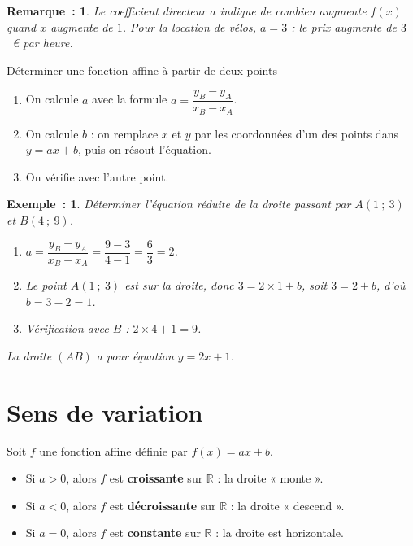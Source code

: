 \documentclass[12pt]{article}
\theoremstyle{break}
\newtheorem*{example}{Exemple~:}
\newtheorem*{remark}{Remarque~:}
\theoremstyle{inline}
\begin{document}
\begin{remark}
  Le coefficient directeur $a$ indique de combien augmente $f(x)$ quand $x$ augmente de $1$.
  Pour la location de vélos, $a = 3$ : le prix augmente de $3$~€ par heure.
\end{remark}

\begin{method}{Déterminer une fonction affine à partir de deux points}{}
  \begin{enumerate}
    \item On calcule $a$ avec la formule $a = \dfrac{y_B - y_A}{x_B - x_A}$.
    \item On calcule $b$ : on remplace $x$ et $y$ par les coordonnées d'un des points dans $y = ax + b$, puis on résout l'équation.
    \item On vérifie avec l'autre point.
  \end{enumerate}
\end{method}

\begin{example}
  Déterminer l'équation réduite de la droite passant par $A(1~;~3)$ et $B(4~;~9)$.

  \begin{multihideW}[1.5em]
    \begin{enumerate}
      \item $a = \dfrac{y_B - y_A}{x_B - x_A} = \dfrac{9 - 3}{4 - 1} = \dfrac{6}{3} = 2$.
      \item Le point $A(1~;~3)$ est sur la droite, donc $3 = 2 \times 1 + b$, soit $3 = 2 + b$, d'où $b = 3 - 2 = 1$.
      \item Vérification avec $B$ : $2 \times 4 + 1 = 9$. \checkmark
    \end{enumerate}
    La droite $(AB)$ a pour équation $y = 2x + 1$.
  \end{multihideW}
\end{example}

\section{Sens de variation}

\begin{proposition}{}{}
  \begin{multihide}
    Soit $f$ une fonction affine définie par $f(x) = ax + b$.
    \begin{itemize}
      \item Si $a > 0$, alors $f$ est \textbf{croissante} sur $\mathbb{R}$ : la droite « monte ».
      \item Si $a < 0$, alors $f$ est \textbf{décroissante} sur $\mathbb{R}$ : la droite « descend ».
      \item Si $a = 0$, alors $f$ est \textbf{constante} sur $\mathbb{R}$ : la droite est horizontale.
    \end{itemize}
  \end{multihide}
\end{proposition}
\end{document}
